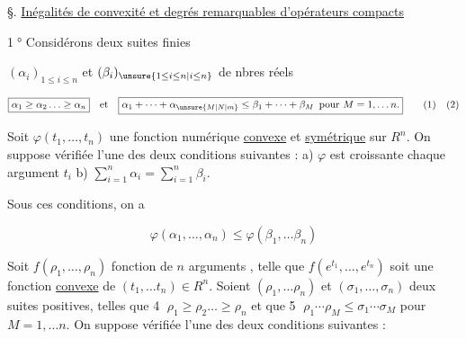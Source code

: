 
§. \uline{Inégalités de convexité et degrés remarquables d'opérateurs compacts}

  \textcircled{1°}   Considérons deux suites finies

$(\alpha_i)_{1\leq i\leq n}$ et $(\beta_i)_{\unsure{1\leq i\leq n|i\leq n}}$ de nbres réels  

\[
\boxed{\alpha_1\geq\alpha_2\ldots\geq\alpha_n}\quad\text{et}\quad
\boxed{\alpha_1+\cdots+\alpha_{\unsure{M|N|m}}\leq\beta_1+\cdots+\beta_M\enspace\text{pour }M=1,\ldots n.}\tag*{(1)\quad(2)}
\]

Soit $\varphi(t_1,\ldots,t_n)$ une fonction numérique \uline{convexe} et \uline{symétrique} sur $R^n$. On suppose vérifiée l'une des deux conditions suivantes : a) $\varphi$ est croissante  chaque argument $t_i$  b) $\sum_{i=1}^n\alpha_i=\sum_{i=1}^{n}\beta_i$.


Sous ces conditions, on a

\[
\varphi(\alpha_1,\ldots,\alpha_n)\leq\varphi(\beta_1,\ldots\beta_n)\tag*{(3)}
\]


  Soit $f(\rho_1,\ldots,\rho_n)$ fonction   de $n$ arguments  , telle que $f(e^{t_1},\ldots,e^{t_n})$ soit une fonction \uline{convexe} de $(t_1,\ldots t_n)\in R^n$. Soient $(\rho_1,\ldots\rho_n)$ et $(\sigma_1,\ldots,\sigma_n)$ deux suites  positives, telles que  \textcircled{4} $\boxed{\rho_1\geq\rho_2\ldots\geq\rho_n}$ et que  \textcircled{5} $\boxed{\rho_1\cdots\rho_M\leq\sigma_1\cdots\sigma_M}$ pour  $M=1,\ldots n$. On suppose vérifiée l'une des deux conditions suivantes :

